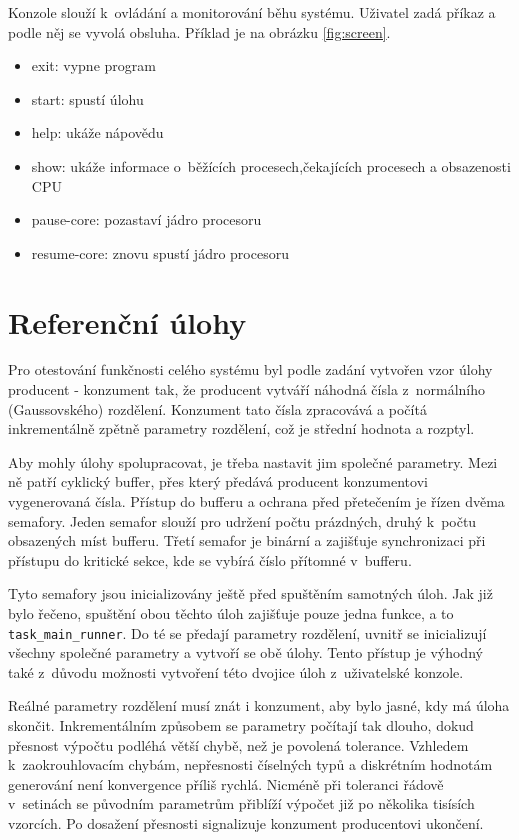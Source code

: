 \documentclass[a4paper,12pt]{article}
\begin{document}
Konzole slouží k~ovládání a monitorování běhu systému. Uživatel zadá příkaz a podle něj se vyvolá obsluha.
Příklad je na obrázku \ref{fig:screen}.

\begin{itemize}
\item exit: vypne program
\item start: spustí úlohu
\item help: ukáže nápovědu
\item show: ukáže informace o~běžících procesech,čekajících procesech a obsazenosti CPU
\item pause-core: pozastaví jádro procesoru
\item resume-core: znovu spustí jádro procesoru
\end{itemize}

\section{Referenční úlohy}

Pro otestování funkčnosti celého systému byl podle zadání vytvořen vzor úlohy producent - konzument tak, že producent vytváří
náhodná čísla z~normálního (Gaussovského) rozdělení. Konzument tato čísla zpracovává a počítá inkrementálně zpětně parametry rozdělení, což je střední hodnota a rozptyl.

Aby mohly úlohy spolupracovat, je třeba nastavit jim společné parametry. Mezi ně patří cyklický buffer, přes který
předává producent konzumentovi vygenerovaná čísla. Přístup do bufferu a ochrana před přetečením je řízen dvěma semafory.
Jeden semafor slouží pro udržení počtu prázdných, druhý k~počtu obsazených míst bufferu. Třetí semafor je binární a zajišťuje synchronizaci při přístupu do kritické sekce, kde se vybírá číslo přítomné v~bufferu.

Tyto semafory jsou inicializovány ještě před spuštěním samotných úloh. Jak již bylo řečeno, spuštění obou těchto úloh
zajišťuje pouze jedna funkce, a to \verb+task_main_runner+. Do té se předají parametry rozdělení, uvnitř se inicializují všechny společné parametry a vytvoří se obě úlohy. Tento přístup je výhodný také z~důvodu možnosti vytvoření této dvojice úloh z~uživatelské konzole.

Reálné parametry rozdělení musí znát i konzument, aby bylo jasné, kdy má úloha skončit. Inkrementálním způsobem se parametry počítají tak dlouho, dokud přesnost výpočtu podléhá větší chybě, než je povolená tolerance. Vzhledem k~zaokrouhlovacím chybám, nepřesnosti číselných typů a diskrétním hodnotám generování není konvergence příliš rychlá. Nicméně při toleranci řádově v~setinách se původním parametrům přiblíží výpočet již po několika tisísích vzorcích. Po dosažení přesnosti signalizuje konzument producentovi ukončení.
\end{document}
